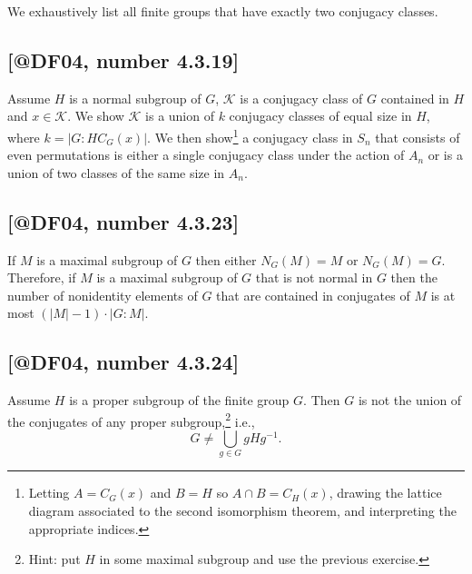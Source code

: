 \documentclass{humanist}
\let\subsubsection\subsection
\let\subsection\section
\let\section\chapter
\let\chapter\part
\newcommand{\sK}{\mathscr{K}}
\providecommand{\abs}[1]{\left\lvert #1 \right\rvert}
\begin{document}
We exhaustively list all finite groups that have exactly two conjugacy
classes.

\hypertarget{number-4.3.19df04-number-4.3.19}{%
\subsubsection{\texorpdfstring{{[}@DF04, number
4.3.19{]}}{, number 4.3.19{[}@DF04, number 4.3.19{]}}}\label{number-4.3.19df04-number-4.3.19}}

Assume \(H\) is a normal subgroup of \(G\), \(\sK\) is a conjugacy class
of \(G\) contained in \(H\) and \(x \in \sK\). We show \(\sK\) is a
union of \(k\) conjugacy classes of equal size in \(H\), where
\(k = \abs{G : HC_G(x)}\). We then show\footnote{Letting \(A = C_G(x)\)
  and \(B = H\) so \(A \cap B = C_H(x)\), drawing the lattice diagram
  associated to the second isomorphism theorem, and interpreting the
  appropriate indices.} a conjugacy class in \(S_n\) that consists of
even permutations is either a single conjugacy class under the action of
\(A_n\) or is a union of two classes of the same size in \(A_n\).

\hypertarget{number-4.3.23df04-number-4.3.23}{%
\subsubsection{\texorpdfstring{{[}@DF04, number
4.3.23{]}}{, number 4.3.23{[}@DF04, number 4.3.23{]}}}\label{number-4.3.23df04-number-4.3.23}}

If \(M\) is a maximal subgroup of \(G\) then either \(N_G(M) = M\) or
\(N_G(M) = G\). Therefore, if \(M\) is a maximal subgroup of \(G\) that
is not normal in \(G\) then the number of nonidentity elements of \(G\)
that are contained in conjugates of \(M\) is at most
\((\abs{M} -1)\cdot \abs{G:M}\).

\hypertarget{number-4.3.24df04-number-4.3.24}{%
\subsubsection{\texorpdfstring{{[}@DF04, number
4.3.24{]}}{, number 4.3.24{[}@DF04, number 4.3.24{]}}}\label{number-4.3.24df04-number-4.3.24}}

Assume \(H\) is a proper subgroup of the finite group \(G\). Then \(G\)
is not the union of the conjugates of any proper subgroup,\footnote{Hint:
  put \(H\) in some maximal subgroup and use the previous exercise.}
i.e., \[G \neq \bigcup_{g \in G} gHg^{-1}.\]
\end{document}
